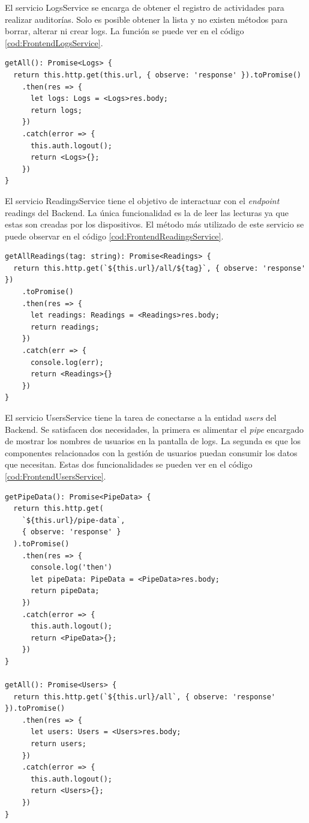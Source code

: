 El servicio LogsService se encarga de obtener el registro de actividades para realizar auditorías.
Solo es posible obtener la lista y no existen métodos para borrar, alterar ni crear logs. La función se puede ver en el código \ref{cod:FrontendLogsService}.

\begin{lstlisting}[label=cod:FrontendLogsService,caption=Obtención de la lista de logs]
getAll(): Promise<Logs> {
  return this.http.get(this.url, { observe: 'response' }).toPromise()
    .then(res => {
      let logs: Logs = <Logs>res.body;
      return logs;
    })
    .catch(error => {
      this.auth.logout();
      return <Logs>{};
    })
}
\end{lstlisting}

El servicio ReadingsService tiene el objetivo de interactuar con el \emph{endpoint} readings del Backend.
La única funcionalidad es la de leer las lecturas ya que estas son creadas por los dispositivos.
El método más utilizado de este servicio se puede observar en el código \ref{cod:FrontendReadingsService}.

\begin{lstlisting}[label=cod:FrontendReadingsService,caption=Obtención de mediciones]
getAllReadings(tag: string): Promise<Readings> {
  return this.http.get(`${this.url}/all/${tag}`, { observe: 'response' })
    .toPromise()
    .then(res => {
      let readings: Readings = <Readings>res.body;
      return readings;
    })
    .catch(err => {
      console.log(err);
      return <Readings>{}
    })
}
\end{lstlisting}

El servicio UsersService tiene la tarea de conectarse a la entidad \emph{users} del Backend.
Se satisfacen dos necesidades, la primera es alimentar el \emph{pipe} encargado de mostrar los nombres de usuarios en la pantalla de logs.
La segunda es que los componentes relacionados con la gestión de usuarios puedan consumir los datos que necesitan.
Estas dos funcionalidades se pueden ver en el código \ref{cod:FrontendUsersService}. 

\begin{lstlisting}[label=cod:FrontendUsersService,caption=Funciones de UsersService]
getPipeData(): Promise<PipeData> {
  return this.http.get(
    `${this.url}/pipe-data`,
    { observe: 'response' }
  ).toPromise()
    .then(res => {
      console.log('then')
      let pipeData: PipeData = <PipeData>res.body;
      return pipeData;
    })
    .catch(error => {
      this.auth.logout();
      return <PipeData>{};
    })
}

getAll(): Promise<Users> {
  return this.http.get(`${this.url}/all`, { observe: 'response' }).toPromise()
    .then(res => {
      let users: Users = <Users>res.body;
      return users;
    })
    .catch(error => {
      this.auth.logout();
      return <Users>{};
    })
}
\end{lstlisting}

